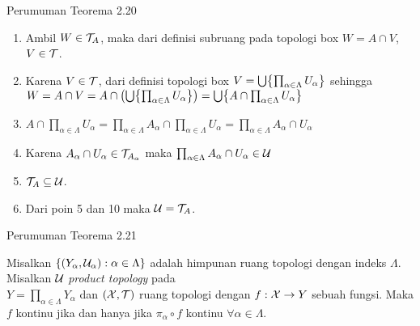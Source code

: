 \begin{frame}{Perumuman Teorema 2.20}
    \begin{tcolorbox}[enhanced,title=Teorema 2.36 (Bukti), frame style tile={width=\paperwidth}{\wallpaper}]
        \begin{enumerate}\addtocounter{enumi}{5}
            \item Ambil $W\in \nT_A$, maka dari definisi subruang pada topologi box
            $W=A\cap V$, $V\in \nT$.
            \item Karena $V\in \nT$, dari definisi topologi box
            $V=\bigcup\set*{\prod_{\alpha\in\Lambda} U_\alpha}$ 
            sehingga $W=A\cap V = A\cap \oio*{\bigcup\set*{\prod_{\alpha\in\Lambda} U_\alpha}} = \bigcup\set*{A\cap\prod_{\alpha\in\Lambda} U_\alpha}$
            \item $A\cap\prod_{\alpha\in\Lambda} U_\alpha=\prod_{\alpha\in\Lambda} A_\alpha\cap \prod_{\alpha\in\Lambda} U_\alpha=\prod_{\alpha\in\Lambda} A_\alpha\cap U_\alpha$
            \item Karena $A_\alpha\cap U_\alpha\in\nT_{A_\alpha}$ maka $\prod_{\alpha\in\Lambda} A_\alpha\cap U_\alpha\in \nU$
            \item $\nT_A\subseteq \nU$.
            \item Dari poin 5 dan 10 maka $\nU = \nT_A$.
        \end{enumerate}
    \end{tcolorbox}
\end{frame}

\begin{frame}{Perumuman Teorema 2.21}
    \begin{tcolorbox}[enhanced,title=Teorema 2.37, frame style tile={width=\paperwidth}{\wallpaper}]
        Misalkan $\set*{\oio*{Y_\alpha,\nU_\alpha}:\alpha \in \Lambda}$ adalah himpunan ruang topologi
        dengan indeks $\Lambda$. Misalkan $\nU$ \textit{product topology} pada \\$Y=\prod_{\alpha \in \Lambda}Y_\alpha$ dan
        $\oio*{\nX,\nT}$ ruang topologi dengan $f:\nX \to Y$ sebuah fungsi. Maka $f$ kontinu jika dan
        hanya jika $\pi_\alpha \circ f$ kontinu $\forall \alpha \in \Lambda$.
    \end{tcolorbox}
\end{frame}

